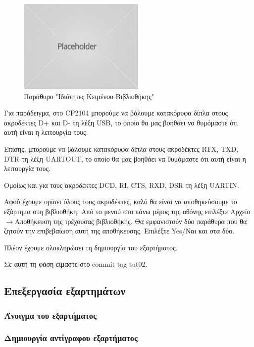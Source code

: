 \documentclass[a4paper]{article}
\begin{document}
\begin{figure}
  \begin{center}
    \includegraphics{img/kicad-main.png}
    \caption{Παράθυρο "Ιδιότητες Κειμένου Βιβλιοθήκης"}
    \label{fig:kicad-main}
  \end{center}
\end{figure}

Για παράδειγμα, στο CP2104 μπορούμε να βάλουμε κατακόρυφα δίπλα στους ακροδέκτες D+ και D- τη λέξη USB, το οποίο θα μας βοηθάει να θυμόμαστε ότι αυτή είναι η λειτουργία τους.

Επίσης, μπορούμε να βάλουμε κατακόρυφα δίπλα στους ακροδέκτες RTX, TXD, DTR τη λέξη UARTOUT, το οποίο θα μας βοηθάει να θυμόμαστε ότι αυτή είναι η λειτουργία τους.

Ομοίως και για τους ακροδέκτες DCD, RI, CTS, RXD, DSR τη λέξη UARTΙΝ.

Αφού έχουμε ορίσει όλους τους ακροδέκτες, καλό θα είναι να αποθηκεύσουμε το εξάρτημα στη βιβλιοθήκη. Από το μενού στο πάνω μέρος της οθόνης επιλέξτε Αρχείο$\rightarrow$Αποθήκευση της τρέχουσας βιβλιοθήκης. Θα εμφανιστούν δύο παράθυρα που θα ζητούν την επιβεβαίωση αυτή της αποθήκευσης. Επιλέξτε Yes/Ναι και στα δύο.

Πλέον έχουμε ολοκληρώσει τη δημιουργία του εξαρτήματος.

Σε αυτή τη φάση είμαστε στο commit tag tut02.

\subsection{Επεξεργασία εξαρτημάτων}

\subsubsection{Άνοιγμα του εξαρτήματος}

\subsubsection{Δημιουργία αντίγραφου εξαρτήματος}
\end{document}
